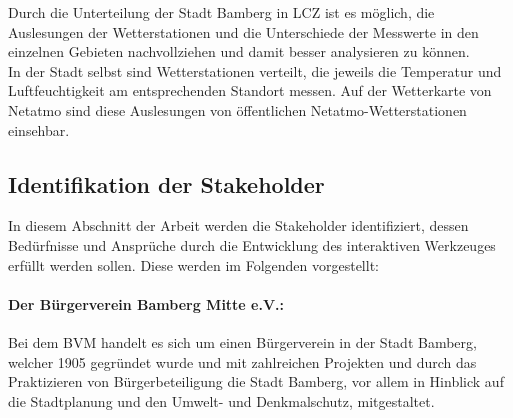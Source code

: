 Durch die Unterteilung der Stadt Bamberg in \ac{LCZ} ist es möglich, die Auslesungen der Wetterstationen und die Unterschiede der Messwerte in den einzelnen Gebieten nachvollziehen und damit besser analysieren zu können. \\ In der Stadt selbst sind Wetterstationen verteilt, die jeweils die Temperatur und Luftfeuchtigkeit am entsprechenden Standort messen. Auf der Wetterkarte von Netatmo sind diese Auslesungen von öffentlichen Netatmo-Wetterstationen einsehbar.

\subsection{Identifikation der Stakeholder}
\label{sec:stakeholder}
In diesem Abschnitt der Arbeit werden die Stakeholder identifiziert, dessen Bedürfnisse und Ansprüche durch die Entwicklung des interaktiven Werkzeuges erfüllt werden sollen. Diese werden im Folgenden vorgestellt:

\paragraph{Der Bürgerverein Bamberg Mitte e.V.:}
Bei dem \ac{BVM} handelt es sich um einen Bürgerverein in der Stadt Bamberg, welcher 1905 gegründet wurde und mit zahlreichen Projekten und durch das Praktizieren von Bürgerbeteiligung die Stadt Bamberg, vor allem in Hinblick auf die Stadtplanung und den Umwelt- und Denkmalschutz, mitgestaltet.


